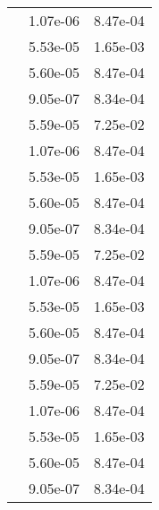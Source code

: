 \begin{table}
\begin{tabular}{c|cc|}
\multicolumn{1}{|c|}{} & \multicolumn{1}{|c|}{  1.07e-06} & \multicolumn{1}{|c|}{  8.47e-04} \\ 
\multicolumn{1}{|c|}{} & \multicolumn{1}{|c|}{  5.53e-05} & \multicolumn{1}{|c|}{  1.65e-03} \\ 
\multicolumn{1}{|c|}{} & \multicolumn{1}{|c|}{  5.60e-05} & \multicolumn{1}{|c|}{  8.47e-04} \\ 
\multicolumn{1}{|c|}{} & \multicolumn{1}{|c|}{  9.05e-07} & \multicolumn{1}{|c|}{  8.34e-04} \\ 
\multicolumn{1}{|c|}{} & \multicolumn{1}{|c|}{  5.59e-05} & \multicolumn{1}{|c|}{  7.25e-02} \\ 
\multicolumn{1}{|c|}{} & \multicolumn{1}{|c|}{  1.07e-06} & \multicolumn{1}{|c|}{  8.47e-04} \\ 
\multicolumn{1}{|c|}{} & \multicolumn{1}{|c|}{  5.53e-05} & \multicolumn{1}{|c|}{  1.65e-03} \\ 
\multicolumn{1}{|c|}{} & \multicolumn{1}{|c|}{  5.60e-05} & \multicolumn{1}{|c|}{  8.47e-04} \\ 
\multicolumn{1}{|c|}{} & \multicolumn{1}{|c|}{  9.05e-07} & \multicolumn{1}{|c|}{  8.34e-04} \\ 
\multicolumn{1}{|c|}{} & \multicolumn{1}{|c|}{  5.59e-05} & \multicolumn{1}{|c|}{  7.25e-02} \\ 
\multicolumn{1}{|c|}{} & \multicolumn{1}{|c|}{  1.07e-06} & \multicolumn{1}{|c|}{  8.47e-04} \\ 
\multicolumn{1}{|c|}{} & \multicolumn{1}{|c|}{  5.53e-05} & \multicolumn{1}{|c|}{  1.65e-03} \\ 
\multicolumn{1}{|c|}{} & \multicolumn{1}{|c|}{  5.60e-05} & \multicolumn{1}{|c|}{  8.47e-04} \\ 
\multicolumn{1}{|c|}{} & \multicolumn{1}{|c|}{  9.05e-07} & \multicolumn{1}{|c|}{  8.34e-04} \\ 
\multicolumn{1}{|c|}{} & \multicolumn{1}{|c|}{  5.59e-05} & \multicolumn{1}{|c|}{  7.25e-02} \\ 
\multicolumn{1}{|c|}{} & \multicolumn{1}{|c|}{  1.07e-06} & \multicolumn{1}{|c|}{  8.47e-04} \\ 
\multicolumn{1}{|c|}{} & \multicolumn{1}{|c|}{  5.53e-05} & \multicolumn{1}{|c|}{  1.65e-03} \\ 
\multicolumn{1}{|c|}{} & \multicolumn{1}{|c|}{  5.60e-05} & \multicolumn{1}{|c|}{  8.47e-04} \\ 
\multicolumn{1}{|c|}{} & \multicolumn{1}{|c|}{  9.05e-07} & \multicolumn{1}{|c|}{  8.34e-04} \\ 

\end{tabular}
\end{table}
